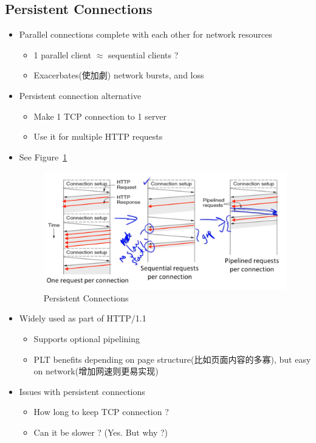 \documentclass[12pt]{ctexart}   %
\begin{document}
	\subsection{Persistent Connections}
	\begin{itemize}
		\item Parallel connections complete with each other for network resources
		\begin{itemize}
			\item 1 parallel client $\approx$ sequential clients ?
			\item Exacerbates(使加劇) network bursts, and loss
		\end{itemize}
		
		\item Persistent connection alternative
		\begin{itemize}
			\item Make 1 TCP connection to 1 server
			\item Use it for multiple HTTP requests
		\end{itemize}
		
		\item See Figure~\ref{fig:8-5-2}
		  
		 \begin{figure}[h!] %
		\centering
		 \includegraphics[scale=0.7]{images/8-5-2}
		\caption{ Persistent Connections}
		 \label{fig:8-5-2}
		 \end{figure}
		 
		 \item Widely used as part of HTTP/1.1
		 \begin{itemize}
		 	\item Supports optional pipelining
		 	\item PLT benefits depending on page structure(比如页面内容的多寡), but easy on network(增加网速则更易实现)
		 \end{itemize}
		 
		 \item Issues with persistent connections
		 \begin{itemize}
		 	\item How long to keep TCP connection ?
		 	\item Can it be slower ? (Yes. But why ?)
		 \end{itemize}
	\end{itemize}
	
\end{document}
